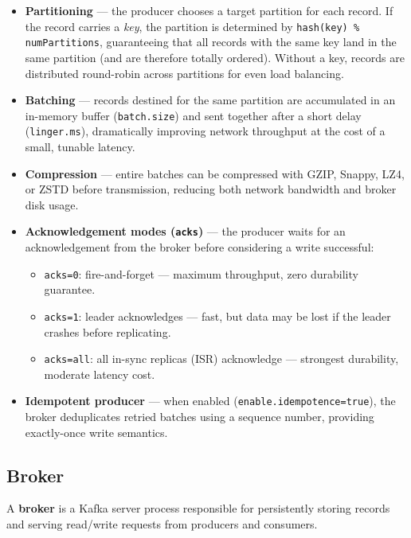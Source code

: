 \begin{itemize}
  \item \textbf{Partitioning} — the producer chooses a target partition for each record.
        If the record carries a \emph{key}, the partition is determined by \texttt{hash(key) \% numPartitions},
        guaranteeing that all records with the same key land in the same partition (and are therefore totally ordered).
        Without a key, records are distributed round-robin across partitions for even load balancing.
  \item \textbf{Batching} — records destined for the same partition are accumulated in an in-memory buffer
        (\texttt{batch.size}) and sent together after a short delay (\texttt{linger.ms}),
        dramatically improving network throughput at the cost of a small, tunable latency.
  \item \textbf{Compression} — entire batches can be compressed with GZIP, Snappy, LZ4, or ZSTD
        before transmission, reducing both network bandwidth and broker disk usage.
  \item \textbf{Acknowledgement modes (\texttt{acks})} — the producer waits for an acknowledgement
        from the broker before considering a write successful:
    \begin{itemize}
      \item \texttt{acks=0}: fire-and-forget — maximum throughput, zero durability guarantee.
      \item \texttt{acks=1}: leader acknowledges — fast, but data may be lost if the leader crashes before replicating.
      \item \texttt{acks=all}: all in-sync replicas (ISR) acknowledge — strongest durability, moderate latency cost.
    \end{itemize}
  \item \textbf{Idempotent producer} — when enabled (\texttt{enable.idempotence=true}), the broker
        deduplicates retried batches using a sequence number, providing exactly-once write semantics.
\end{itemize}

\subsection{Broker}

A \textbf{broker} is a Kafka server process responsible for persistently storing records and
serving read/write requests from producers and consumers.

